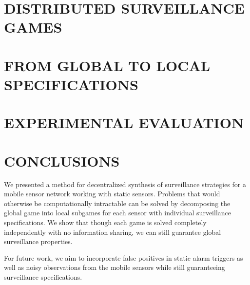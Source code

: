 \documentclass[letterpaper, 10 pt, conference]{ieeeconf}  %
\begin{document}



\section{DISTRIBUTED SURVEILLANCE GAMES}


\section{FROM GLOBAL TO LOCAL SPECIFICATIONS}

%
%

\section{EXPERIMENTAL EVALUATION}\label{sec:experiments}



\section{CONCLUSIONS}
We presented a method for decentralized synthesis of surveillance strategies for a mobile sensor network working with static sensors. Problems that would otherwise be computationally intractable can be solved by decomposing the global game into local subgames for each sensor with individual surveillance specifications. We show that though each game is solved completely independently with no information sharing, we can still guarantee global surveillance properties.

For future work, we aim to incorporate false positives in static alarm triggers as well as noisy observations from the mobile sensors while still guaranteeing surveillance specifications.








\end{document}
